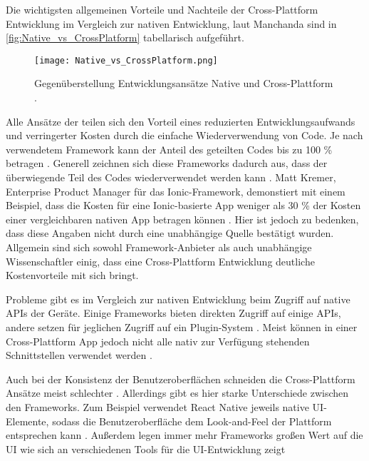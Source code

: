 Die wichtigsten allgemeinen Vorteile und Nachteile der Cross-Plattform Entwicklung im Vergleich zur nativen Entwicklung, laut Manchanda \cite{Manchanda_CrossPlatformFrameworks} sind in \autoref{fig:Native_vs_CrossPlatform} tabellarisch aufgeführt.
\begin{figure}[H]
    \centering
    \texttt{[image: Native\_vs\_CrossPlatform.png]}
    \caption{Gegenüberstellung Entwicklungsansätze Native und Cross-Plattform \cite{Manchanda_CrossPlatformFrameworks}.}
    \label{fig:Native_vs_CrossPlatform}
\end{figure}

Alle Ansätze der teilen sich den Vorteil eines reduzierten Entwicklungsaufwands und verringerter Kosten durch die einfache Wiederverwendung von Code.
Je nach verwendetem Framework kann der Anteil des geteilten Codes bis zu 100 \% betragen \cite{NET_MAUI_Introduction,Nawrocki_Comparison_Hybrid_Native_Frameworks}.
Generell zeichnen sich diese Frameworks dadurch aus, dass der überwiegende Teil des Codes wiederverwendet werden kann \cite{Nawrocki_Comparison_Hybrid_Native_Frameworks}.
Matt Kremer, Enterprise Product Manager für das Ionic-Framework, demonstiert mit einem Beispiel, dass die Kosten für eine Ionic-basierte App weniger als 30 \% der Kosten einer vergleichbaren nativen App betragen können \cite{Kremer_IonicROI}.
Hier ist jedoch zu bedenken, dass diese Angaben nicht durch eine unabhängige Quelle bestätigt wurden.
Allgemein sind sich sowohl Framework-Anbieter \cite{Xamarin_Homepage, Kremer_IonicROI} als auch unabhängige Wissenschaftler \cite{Pinto_Native_to_Cross_Platform, Que_Comparison_Hybrid_Native, Nawrocki_Comparison_Hybrid_Native_Frameworks} einig, dass eine Cross-Plattform Entwicklung deutliche Kostenvorteile mit sich bringt.

Probleme gibt es im Vergleich zur nativen Entwicklung beim Zugriff auf native \acp{API} der Geräte.
Einige Frameworks bieten direkten Zugriff auf einige \acp{API}, andere setzen für jeglichen Zugriff auf ein Plugin-System \cite{Heitkoetter_CrossPlatform_Comparison, Sasidaran_Survey_NativeHybrid}.
Meist können in einer Cross-Plattform App jedoch nicht alle nativ zur Verfügung stehenden Schnittstellen verwendet werden \cite{Pinto_Native_to_Cross_Platform}.

Auch bei der Konsistenz der Benutzeroberflächen schneiden die Cross-Plattform Ansätze meist schlechter \cite{Manchanda_CrossPlatformFrameworks}.
Allerdings gibt es hier starke Unterschiede zwischen den Frameworks. 
Zum Beispiel verwendet React Native jeweils native \ac{UI}-Elemente, sodass die Benutzeroberfläche dem Look-and-Feel der Plattform entsprechen kann \cite{Cook_ReactNativeBridge}.
Außerdem legen immer mehr Frameworks großen Wert auf die \ac{UI} wie sich an verschiedenen Tools für die \ac{UI}-Entwicklung zeigt \cite{NET_MAUI_Introduction,Flutter_Architektur}

